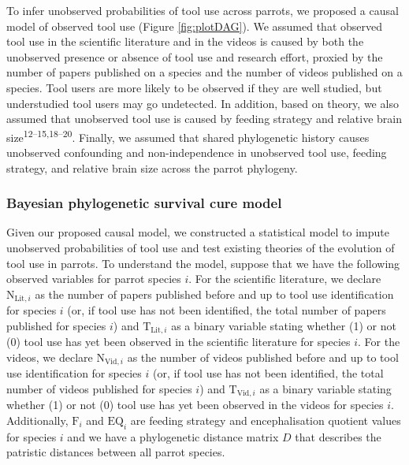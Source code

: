 \documentclass[
  man, donotrepeattitle,floatsintext]{apa6}
\begin{document}
To infer unobserved probabilities of tool use across parrots, we proposed a
causal model of observed tool use (Figure \ref{fig:plotDAG}). We assumed that
observed tool use in the scientific literature and in the videos is caused by
both the unobserved presence or absence of tool use and research effort, proxied
by the number of papers published on a species and the number of videos
published on a species. Tool users are more likely to be observed if they are
well studied, but understudied tool users may go undetected. In addition, based
on theory, we also assumed that unobserved tool use is caused by feeding
strategy and relative brain size\textsuperscript{12--15,18--20}. Finally, we
assumed that shared phylogenetic history causes unobserved confounding and
non-independence in unobserved tool use, feeding strategy, and relative brain
size across the parrot phylogeny.

\hypertarget{bayesian-phylogenetic-survival-cure-model}{%
\subsubsection{Bayesian phylogenetic survival cure model}\label{bayesian-phylogenetic-survival-cure-model}}

Given our proposed causal model, we constructed a statistical model to impute
unobserved probabilities of tool use and test existing theories of the evolution
of tool use in parrots. To understand the model, suppose that we have the
following observed variables for parrot species \(i\). For the scientific
literature, we declare \(\text{N}_{\text{Lit},i}\) as the number of papers
published before and up to tool use identification for species \(i\) (or, if tool
use has not been identified, the total number of papers published for species
\(i\)) and \(\text{T}_{\text{Lit},i}\) as a binary variable stating whether (1) or
not (0) tool use has yet been observed in the scientific literature for species
\(i\). For the videos, we declare \(\text{N}_{\text{Vid},i}\) as the
number of videos published before and up to tool use identification for species
\(i\) (or, if tool use has not been identified, the total number of videos
published for species \(i\)) and \(\text{T}_{\text{Vid},i}\) as a binary variable
stating whether (1) or not (0) tool use has yet been observed in the
videos for species \(i\). Additionally, \(\text{F}_i\) and
\(\text{EQ}_i\) are feeding strategy and encephalisation quotient values for
species \(i\) and we have a phylogenetic distance matrix \(D\) that describes the
patristic distances between all parrot species.
\end{document}
